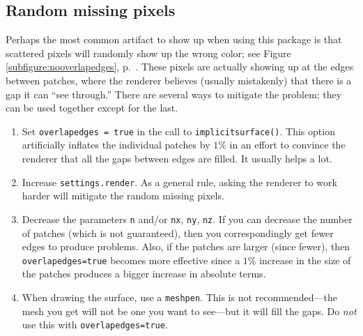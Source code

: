 \documentclass{article}
\begin{document}
\subsection{Random missing pixels}
Perhaps the most common artifact to show up when using this package 
is that scattered pixels will randomly show up the wrong color; see
Figure \ref{subfigure:nooverlapedges}, p.~\pageref{subfigure:nooverlapedges}.
These pixels are actually showing up at the edges between patches, where the renderer 
believes (usually mistakenly) that there is a gap it can ``see through.'' There are 
several ways to mitigate the problem; they can be used together except for the last.
\begin{enumerate}
\item Set \lstinline!overlapedges = true! in the call to 
\lstinline!implicitsurface()!. This 
option artificially inflates the individual patches by $1\%$ in an effort to convince the 
renderer that all the gaps between edges are filled. It usually helps a lot.
\item Increase \lstinline!settings.render!. As a general rule, asking the renderer to work 
harder will mitigate the random missing pixels.
\item Decrease the parameters 
\lstinline!n! and/or \lstinline!nx!, \lstinline!ny!, \lstinline!nz!. If you can decrease the number 
of patches (which is not guaranteed), then you correspondingly get fewer edges to produce problems.
Also, if the patches are larger (since fewer), then \lstinline!overlapedges=true! becomes more effective
since a $1\%$ increase in the size of the patches produces a bigger increase in absolute terms.
\item When drawing the surface, use a \lstinline!meshpen!. This is not recommended---the mesh you 
get will not be one you want to see---but it will fill the gaps. Do \emph{not} use this with
\lstinline!overlapedges=true!.
\end{enumerate}
%
\end{document}
